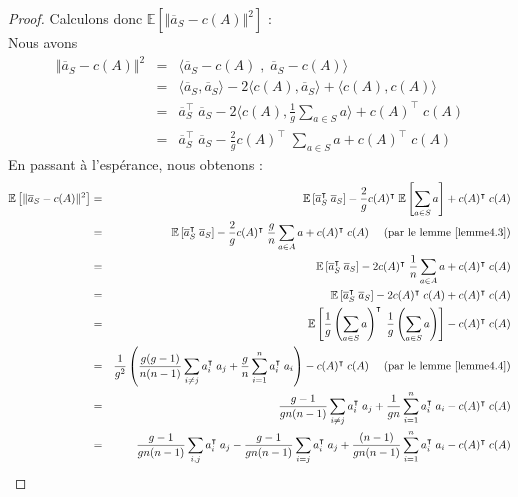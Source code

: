 \documentclass[12pt,a4paper]{book}
\newcommand{\E}{\mathbb{E}}
\newcommand{\1}{\mathds{1}}
\begin{document}
\begin{proof}
		Calculons donc $\E \left[ \Vert \overline{a}_S - c(A) \Vert^2 \right]$  : \\
		Nous avons 
		\begin{eqnarray*}
			\Vert \overline{a}_S - c(A) \Vert^2 &=& \langle \overline{a}_S - c(A) \; , \; \overline{a}_S - c(A)  \rangle \\
			&=& \langle \overline{a}_S, \overline{a}_S \rangle -2 \langle c(A), \overline{a}_S \rangle + \langle c(A), c(A) \rangle \\
			&=& \overline{a}_S^\intercal \; \overline{a}_S - 2 \langle c(A), \frac{1}{g} \sum_{a \in S} a \rangle + c(A)^\intercal \; c(A)	\\
			&=& \overline{a}_S^\intercal \; \overline{a}_S - \frac{2}{g}  c(A)^\intercal \; \sum_{a \in S} a + c(A)^\intercal \; c(A)
		\end{eqnarray*}
		En passant à l'espérance, nous obtenons : 
		\begin{eqnarray*}
			\E \left[ \Vert \overline{a}_S - c(A) \Vert^2 \right] &=& \E \left[ \overline{a}_S^\intercal \; \overline{a}_S \right] - \frac{2}{g} c(A)^\intercal \; \E \left[ \sum_{a \in S} a \right] + c(A)^\intercal \; c(A) \\
			&=& \E \left[ \overline{a}_S^\intercal \; \overline{a}_S \right] - \frac{2}{g} c(A)^\intercal \; \frac{g}{n} \sum_{a \in A} a + c(A)^\intercal \; c(A) \quad \textrm{ (par le lemme \ref{lemme4.3})} \\ 
			&=& \E \left[ \overline{a}_S^\intercal \; \overline{a}_S \right] - 2 c(A)^\intercal \; \frac{1}{n} \sum_{a \in A} a + c(A)^\intercal \; c(A) \\
			&=& \E \left[ \overline{a}_S^\intercal \; \overline{a}_S \right] - 2 c(A)^\intercal \; c(A) + c(A)^\intercal \; c(A) \\
			&=& \E \left[ \frac{1}{g} \left( \sum_{a \in S} a \right)^\intercal \; \frac{1}{g} \left( \sum_{a \in S} a \right) \right] - c(A)^\intercal \; c(A) \\
			&=& \frac{1}{g^2} \left( \frac{g(g-1)}{n(n-1)} \sum_{i \neq j} a_i^\intercal \; a_j + \frac{g}{n}  \sum_{i=1}^n a_i^\intercal \; a_i \right) - c(A)^\intercal \; c(A) \quad \textrm{ (par le lemme \ref{lemme4.4})} \\
			&=& \frac{g-1}{gn(n-1)} \sum_{i \neq j} a_i^\intercal \; a_j + \frac{1}{gn} \sum_{i=1}^n a_i^\intercal \; a_i - c(A)^\intercal \; c(A) \\
			&=&  \frac{g-1}{gn(n-1)} \sum_{i,j} a_i^\intercal \; a_j -  \frac{g-1}{gn(n-1)} \sum_{i = j} a_i^\intercal \; a_j + \frac{(n-1)}{gn(n-1)} \sum_{i=1}^n a_i^\intercal \; a_i - c(A)^\intercal \; c(A) \\

\end{eqnarray*}
\end{proof}
\end{document}

